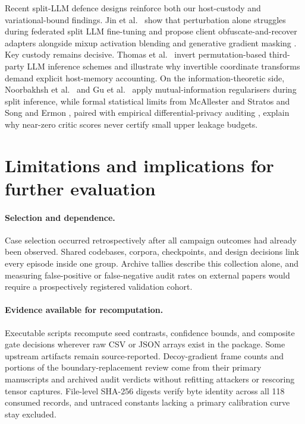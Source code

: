 Recent split-LLM defence designs reinforce both our host-custody and
variational-bound findings. Jin et al.\ \cite{privpair2026} show that
perturbation alone struggles during federated split LLM fine-tuning and
propose client obfuscate-and-recover adapters alongside mixup activation
blending \cite{mixguard2026} and generative gradient masking
\cite{aegis2026}. Key custody remains decisive. Thomas et al.\
\cite{permattack2025} invert permutation-based third-party LLM inference
schemes and illustrate why invertible coordinate transforms demand explicit
host-memory accounting. On the information-theoretic side, Noorbakhsh et
al.\ \cite{mitech2026} and Gu et al.\ \cite{pidi2026} apply
mutual-information regularisers during split inference, while formal
statistical limits from McAllester and Stratos \cite{mcallester2020} and
Song and Ermon \cite{song2020}, paired with empirical differential-privacy
auditing \cite{jagielski2020}, explain why near-zero critic scores never
certify small upper leakage budgets.

\section{Limitations and implications for further evaluation}
\label{sec:limits}

\paragraph{Selection and dependence.}
Case selection occurred retrospectively after all campaign outcomes had
already been observed. Shared codebases, corpora, checkpoints, and design
decisions link every episode inside one group. Archive tallies describe
this collection alone, and measuring false-positive or false-negative audit
rates on external papers would require a prospectively registered
validation cohort.

\paragraph{Evidence available for recomputation.}
Executable scripts recompute seed contrasts, confidence bounds, and
composite gate decisions wherever raw CSV or JSON arrays exist in the
package. Some upstream artifacts remain source-reported. Decoy-gradient
frame counts and portions of the boundary-replacement review come from
their primary manuscripts and archived audit verdicts without refitting
attackers or rescoring tensor captures. File-level SHA-256 digests verify
byte identity across all 118 consumed records, and untraced constants
lacking a primary calibration curve stay excluded.

